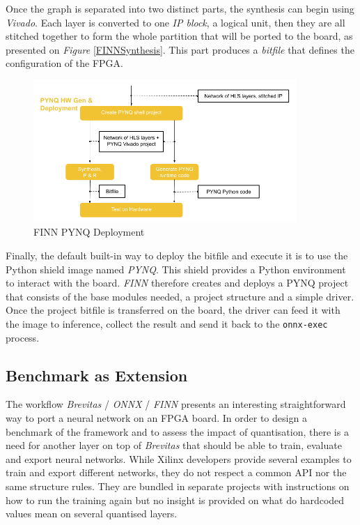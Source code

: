 Once the graph is separated into two distinct parts, the synthesis can begin using \emph{Vivado}. Each layer is converted to one \emph{IP block}, a logical unit, then they are all stitched together to form the whole partition that will be ported to the board, as presented on \emph{Figure} \ref{FINNSynthesis}. This part produces a \emph{bitfile} that defines the configuration of the FPGA.

\begin{figure}[htbp]
	\centering
		\includegraphics[width=10cm]{Figures/FINNPYNQ.png}
	\caption[FINN PYNQ Deployment]{FINN PYNQ Deployment}
	\label{fig:FINNPYNQ}
\end{figure}

Finally, the default built-in way to deploy the bitfile and execute it is to use the Python shield image named \emph{PYNQ}. This shield provides a Python environment to interact with the board. \emph{FINN} therefore creates and deploys a PYNQ project that consists of the base modules needed, a project structure and a simple driver. Once the project bitfile is transferred on the board, the driver can feed it with the image to inference, collect the result and send it back to the \texttt{onnx-exec} process.


\subsection{Benchmark as Extension}

The workflow \emph{Brevitas} / \emph{ONNX} / \emph{FINN} presents an interesting straightforward way to port a neural network on an FPGA board. In order to design a benchmark of the framework and to assess the impact of quantisation, there is a need for another layer on top of \emph{Brevitas} that should be able to train, evaluate and export neural networks. While Xilinx developers provide several examples to train and export different networks, they do not respect a common API nor the same structure rules. They are bundled in separate projects with instructions on how to run the training again but no insight is provided on what do hardcoded values mean on several quantised layers.

